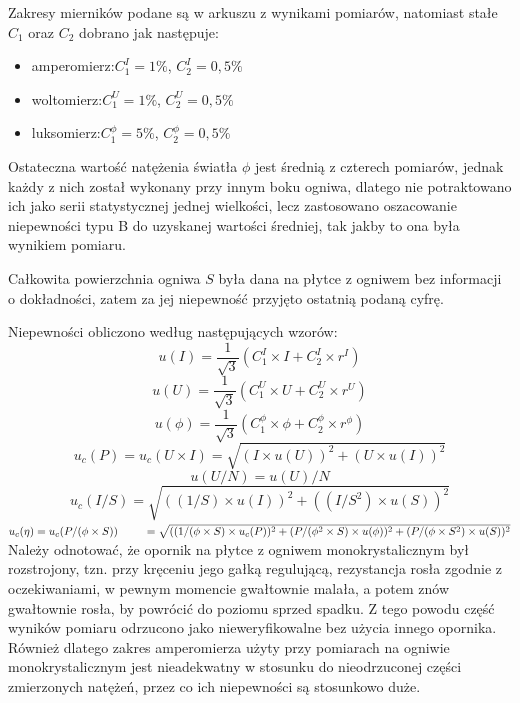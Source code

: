 \documentclass[12pt,a4paper]{article}
\begin{document}
Zakresy mierników podane są w arkuszu z wynikami pomiarów, natomiast stałe $C_1$ oraz $C_2$ dobrano jak następuje:
\begin{itemize}
\TabPositions{3cm}
\item amperomierz:\tab$C_1^I = 1\%$, $C_2^I = 0,5\%$
\item woltomierz:\tab$C_1^U = 1\%$, $C_2^U = 0,5\%$
\item luksomierz:\tab$C_1^\phi = 5\%$, $C_2^\phi = 0,5\%$
\end{itemize}

Ostateczna wartość natężenia światła $\phi$ jest średnią z czterech pomiarów, jednak każdy z nich został wykonany przy innym boku ogniwa, dlatego nie potraktowano ich jako serii statystycznej jednej wielkości, lecz zastosowano oszacowanie niepewności typu B do uzyskanej wartości średniej, tak jakby to ona była wynikiem pomiaru.

Całkowita powierzchnia ogniwa $S$ była dana na płytce z ogniwem bez informacji o dokładności, zatem za jej niepewność przyjęto ostatnią podaną cyfrę.

Niepewności obliczono według następujących wzorów:\\
$$u(I) = \frac{1}{\sqrt{3}} (C_1^I \times I + C_2^I \times r^I)$$
$$u(U) = \frac{1}{\sqrt{3}} (C_1^U \times U + C_2^U \times r^U)$$
$$u(\phi) = \frac{1}{\sqrt{3}} (C_1^\phi \times \phi + C_2^\phi \times r^\phi)$$
$$u_c(P) = u_c(U \times I) = \sqrt{(I \times u(U))^2 + (U \times u(I))^2}$$
$$u(U/N) = u(U)/N$$
$$u_c(I/S) = \sqrt{((1/S) \times u(I))^2 + ((I/S^2) \times u(S))^2}$$
$u_c(\eta) = u_c(P/(\phi \times S))\\ \text{\qquad\ } = \sqrt{((1/(\phi \times S) \times u_c(P))^2 + (P/(\phi^2 \times S) \times u(\phi))^2 + (P/(\phi \times S^2) \times u(S))^2}$\\

Należy odnotować, że opornik na płytce z ogniwem monokrystalicznym był rozstrojony, tzn. przy kręceniu jego gałką regulującą, rezystancja rosła zgodnie z oczekiwaniami, w pewnym momencie gwałtownie malała, a potem znów gwałtownie rosła, by powrócić do poziomu sprzed spadku. Z tego powodu część wyników pomiaru odrzucono jako nieweryfikowalne bez użycia innego opornika. Również dlatego zakres amperomierza użyty przy pomiarach na ogniwie monokrystalicznym jest nieadekwatny w stosunku do nieodrzuconej części zmierzonych natężeń, przez co ich niepewności są stosunkowo duże.
\end{document}
